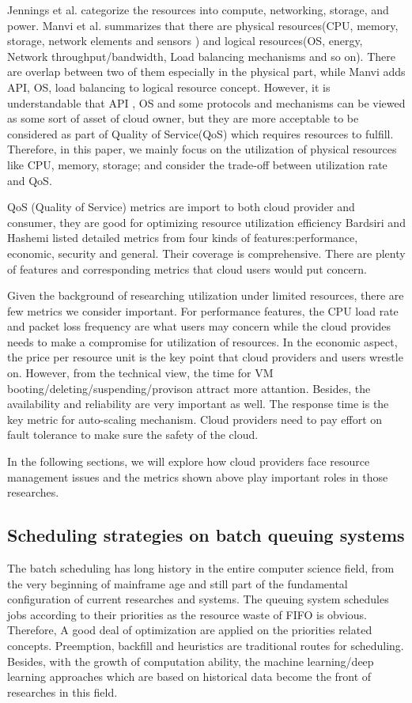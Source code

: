 Jennings et al. categorize the resources into compute, networking, storage, and power. 
Manvi et al. summarizes that there are physical resources(CPU, memory, storage, network elements and sensors ) and logical resources(OS, energy, Network throughput/bandwidth, Load balancing mechanisms and so on).
There are overlap between two of them especially in the physical part, while Manvi adds API, OS, load balancing to logical resource concept.
However, it is understandable that API , OS and some protocols and mechanisms  can be viewed as some sort of asset of cloud owner, but they are more acceptable to be considered as part of Quality of Service(QoS) which requires resources to fulfill.
Therefore, in this paper, we mainly focus on the utilization of physical resources like CPU, memory, storage; and consider the trade-off between utilization rate and QoS.

QoS (Quality of Service) metrics are import to both cloud provider and consumer, they are good for optimizing resource utilization efficiency
Bardsiri and Hashemi listed detailed metrics from four kinds of features:performance, economic, security and general. \cite{Bardsiri2014}
Their coverage is comprehensive. There are plenty of features and corresponding metrics that cloud users would put concern.

Given the background of researching utilization under limited resources, there are few metrics we consider important. 
For performance features, the CPU load rate and packet loss frequency are what users may concern while the cloud provides needs to make a compromise for utilization of resources.
In the economic aspect, the price per resource unit is the key point that cloud  providers and users wrestle on. However, from the technical view, the time for VM booting/deleting/suspending/provison attract more attantion.
Besides, the availability and reliability are very important as well. The response time is the key metric for auto-scaling mechanism.
Cloud providers need to pay effort on fault tolerance to make sure the safety of the cloud.

In the following sections, we will explore how cloud providers face resource management issues and the metrics shown above play important roles in  those researches.

\subsection{Scheduling strategies on batch queuing systems }
The batch scheduling has long history in the entire computer science field, from the very beginning of mainframe age and still part of the fundamental configuration of current researches and systems.
The queuing system schedules jobs according to their priorities as the resource waste of FIFO is obvious. Therefore, A good deal of optimization are applied on the priorities related concepts.
Preemption, backfill and heuristics are traditional routes for scheduling. Besides, with the growth of computation ability, the machine learning/deep learning approaches which are based on historical data become the front of researches in this field.



